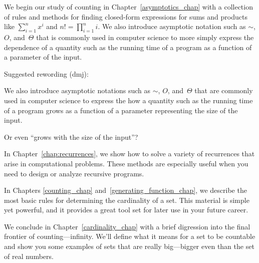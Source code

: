 We begin our study of counting in Chapter~\ref{asymptotics_chap} with
a collection of rules and methods for finding closed-form expressions
for sums and products like $\sum_{i = 1}^n x^i$ and $n! =
\prod_{i=1}^n i$.  We also introduce asymptotic notation such as
$\sim$, $O$, and~$\Theta$ that is commonly used in computer science to
more simply express the dependence of a quantity such as the running
time of a program as a function of a parameter of the input.

\begin{editingnotes}
Suggested rewording (dmj):

\bigskip

We also introduce asymptotic notations such as $\sim$, $O$,
and~$\Theta$ that are commonly used in computer science to express the
how a quantity such as the running time of a program grows as a
function of a parameter representing the size of the input.

\bigskip

Or even ``grows with the size of the input''?

\end{editingnotes}

In Chapter~\ref{chap:recurrences}, we show how to solve a variety of
recurrences that arise in computational problems.  These methods are
especially useful when you need to design or analyze recursive
programs.

In Chapters \ref{counting_chap} and~\ref{generating_function_chap}, we
describe the most basic rules for determining the cardinality of a
set.  This material is simple yet powerful, and it provides a great
tool set for later use in your future career.

We conclude in Chapter~\ref{cardinality_chap} with a brief digression
into the final frontier of counting---infinity.  We'll define what it
means for a set to be countable and show you some examples of sets
that are really big---bigger even than the set of real numbers.

\endinput
